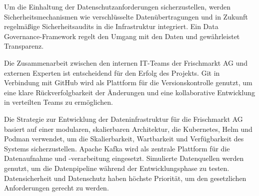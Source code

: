 \documentclass[%
pdftex,
oneside,			%
11pt,				%
parskip=half,		%
headheight = 12pt,	%
headsepline,		%
footsepline,		%
footheight = 16pt,	%
abstracton,		%
DIV=calc,		%
BCOR=8mm,		%
headinclude=false,	%
footinclude=false,	%
listof=totoc,		%
toc=bibliography,	%
]{scrreprt}	%
\begin{document}
    Um die Einhaltung der Datenschutzanforderungen sicherzustellen, werden Sicherheitsmechanismen wie verschlüsselte Datenübertragungen und in Zukunft regelmäßige Sicherheitsaudits in die Infrastruktur integriert.
    Ein Data Governance-Framework regelt den Umgang mit den Daten und gewährleistet Transparenz.


    Die Zusammenarbeit zwischen den internen IT-Teams der Frischmarkt AG und externen Experten ist entscheidend für den Erfolg des Projekts.
    Git in Verbindung mit GitHub wird als Plattform für die Versionskontrolle genutzt, um eine klare Rückverfolgbarkeit der Änderungen und eine kollaborative Entwicklung in verteilten Teams zu ermöglichen.


    Die Strategie zur Entwicklung der Dateninfrastruktur für die Frischmarkt AG basiert auf einer modularen, skalierbaren Architektur, die Kubernetes, Helm und Podman verwendet, um die Skalierbarkeit, Wartbarkeit und Verfügbarkeit des Systems sicherzustellen.
    Apache Kafka wird als zentrale Plattform für die Datenaufnahme und -verarbeitung eingesetzt.
    Simulierte Datenquellen werden genutzt, um die Datenpipeline während der Entwicklungsphase zu testen.
    Datensicherheit und Datenschutz haben höchste Priorität, um den gesetzlichen Anforderungen gerecht zu werden.


\end{document}
